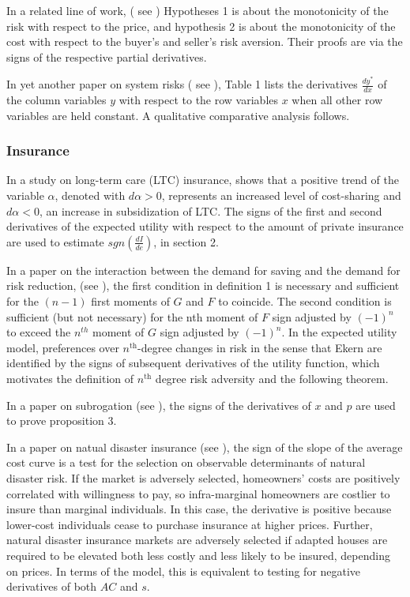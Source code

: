 \documentclass[11pt]{book}
\begin{document}
In a related line of work, ( see \cite{hyndman2021dissolving}) Hypotheses 1 is about the monotonicity
of the risk with respect to the price, and hypothesis 2 is about the
monotonicity of the cost with respect to the buyer's and seller's
risk aversion. Their proofs are via the signs of the respective partial
derivatives.

In yet another paper on system risks ( see \cite{bouvardlabor}), Table 1 lists the derivatives $\frac{dy^{*}}{dx}$
of the column variables $y$ with respect to the row variables $x$
when all other row variables are held constant. A qualitative comparative
analysis follows.


\subsubsection{Insurance}

In a study on long-term care (LTC) insurance,  \cite{zweifel2016long} shows that a positive trend of the variable $\alpha$,
denoted with $d\alpha>0$, represents an increased level of cost-sharing
and $d\alpha<0$, an increase in subsidization of LTC. The signs of
the first and second derivatives of the expected utility with respect
to the amount of private insurance are used to estimate $sgn\left(\frac{dI}{de}\right)$,
in section 2.

In a paper on the interaction between the demand for saving and
the demand for risk reduction, (see \cite{grainich2017interaction}), the first condition in definition 1 is necessary and sufficient for the $\left(n-1\right)$ first moments
of $G$ and $F$ to coincide. The second condition is sufficient (but
not necessary) for the nth moment of $F$ sign adjusted by $(-1)^{n}$
to exceed the $n^{th}$ moment of $G$ sign adjusted by $(-1)^{n}$.
In the expected utility model, preferences over $n^{\text{th}}$-degree
changes in risk in the sense that Ekern are identified by the signs
of subsequent derivatives of the utility function, which motivates
the definition of $n^{\text{th}}$ degree risk adversity and the following
theorem.

In a paper on subrogation (see \cite{polinsky2018subrogation}), the signs of the derivatives of $x$ and $p$ are used to prove proposition 3.

In a paper on natual disaster insurance (see \cite{wagner2019adaptation}),
the sign of the slope of the average cost curve is a test for the selection
on observable determinants of natural disaster risk. If the market
is adversely selected, homeowners' costs are positively correlated
with willingness to pay, so infra-marginal homeowners are costlier
to insure than marginal individuals. In this case, the derivative
is positive because lower-cost individuals cease to purchase insurance
at higher prices. Further, natural disaster insurance markets are
adversely selected if adapted houses are required to be elevated both
less costly and less likely to be insured, depending on prices.
In terms of the model, this is equivalent to testing for negative
derivatives of both $AC$ and $s$.
\end{document}
